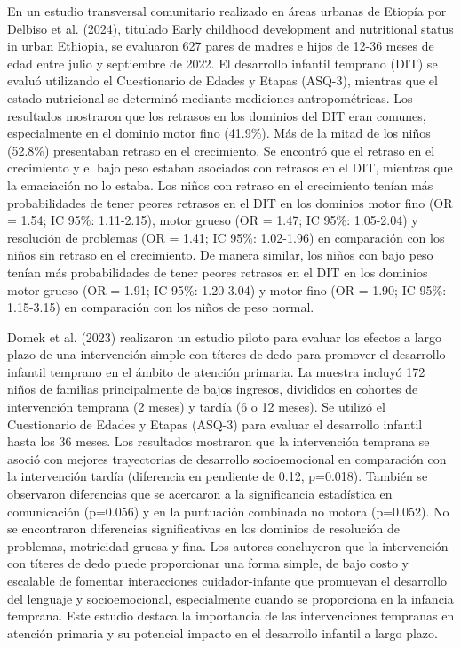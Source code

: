 \documentclass[11pt,letterpaper]{report}
\begin{document}
En un estudio transversal comunitario realizado en áreas urbanas de Etiopía por
Delbiso et al. (2024), titulado Early childhood development and nutritional
status in urban Ethiopia, se evaluaron 627 pares de madres e hijos de 12-36
meses de edad entre julio y septiembre de 2022. El desarrollo infantil temprano
(DIT) se evaluó utilizando el Cuestionario de Edades y Etapas (ASQ-3), mientras
que el estado nutricional se determinó mediante mediciones antropométricas. Los
resultados mostraron que los retrasos en los dominios del DIT eran comunes,
especialmente en el dominio motor fino (41.9\%). Más de la mitad de los niños
(52.8\%) presentaban retraso en el crecimiento. Se encontró que el retraso en
el crecimiento y el bajo peso estaban asociados con retrasos en el DIT,
mientras que la emaciación no lo estaba. Los niños con retraso en el
crecimiento tenían más probabilidades de tener peores retrasos en el DIT en los
dominios motor fino (OR = 1.54; IC 95\%: 1.11-2.15), motor grueso (OR = 1.47;
IC 95\%: 1.05-2.04) y resolución de problemas (OR = 1.41; IC 95\%: 1.02-1.96)
en comparación con los niños sin retraso en el crecimiento. De manera similar,
los niños con bajo peso tenían más probabilidades de tener peores retrasos en
el DIT en los dominios motor grueso (OR = 1.91; IC 95\%: 1.20-3.04) y motor
fino (OR = 1.90; IC 95\%: 1.15-3.15) en comparación con los niños de peso
normal. \cite{Delbiso2024}

Domek et al. (2023) realizaron un estudio piloto para evaluar los efectos a
largo plazo de una intervención simple con títeres de dedo para promover el
desarrollo infantil temprano en el ámbito de atención primaria. La muestra
incluyó 172 niños de familias principalmente de bajos ingresos, divididos en
cohortes de intervención temprana (2 meses) y tardía (6 o 12 meses). Se utilizó
el Cuestionario de Edades y Etapas (ASQ-3) para evaluar el desarrollo infantil
hasta los 36 meses. Los resultados mostraron que la intervención temprana se
asoció con mejores trayectorias de desarrollo socioemocional en comparación con
la intervención tardía (diferencia en pendiente de 0.12, p=0.018). También se
observaron diferencias que se acercaron a la significancia estadística en
comunicación (p=0.056) y en la puntuación combinada no motora (p=0.052). No se
encontraron diferencias significativas en los dominios de resolución de
problemas, motricidad gruesa y fina. Los autores concluyeron que la
intervención con títeres de dedo puede proporcionar una forma simple, de bajo
costo y escalable de fomentar interacciones cuidador-infante que promuevan el
desarrollo del lenguaje y socioemocional, especialmente cuando se proporciona
en la infancia temprana. Este estudio destaca la importancia de las
intervenciones tempranas en atención primaria y su potencial impacto en el
desarrollo infantil a largo plazo. \cite{Domek2023}
\end{document}
